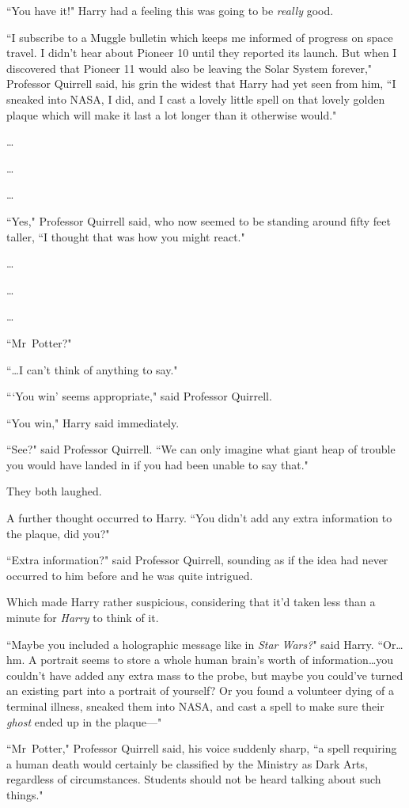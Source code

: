 ``You have it!" Harry had a feeling this was going to be \emph{really} good.

``I subscribe to a Muggle bulletin which keeps me informed of progress on space travel. I didn't hear about Pioneer 10 until they reported its launch. But when I discovered that Pioneer 11 would also be leaving the Solar System forever," Professor Quirrell said, his grin the widest that Harry had yet seen from him, ``I sneaked into NASA, I did, and I cast a lovely little spell on that lovely golden plaque which will make it last a lot longer than it otherwise would."

…

…

…

``Yes," Professor Quirrell said, who now seemed to be standing around fifty feet taller, ``I thought that was how you might react."

…

…

…

``Mr~Potter?"

``…I can't think of anything to say."

``{}`You win' seems appropriate," said Professor Quirrell.

``You win," Harry said immediately.

``See?" said Professor Quirrell. ``We can only imagine what giant heap of trouble you would have landed in if you had been unable to say that."

They both laughed.

A further thought occurred to Harry. ``You didn't add any extra information to the plaque, did you?"

``Extra information?" said Professor Quirrell, sounding as if the idea had never occurred to him before and he was quite intrigued.

Which made Harry rather suspicious, considering that it'd taken less than a minute for \emph{Harry} to think of it.

``Maybe you included a holographic message like in \emph{Star Wars?}" said Harry. ``Or…hm. A portrait seems to store a whole human brain's worth of information…you couldn't have added any extra mass to the probe, but maybe you could've turned an existing part into a portrait of yourself? Or you found a volunteer dying of a terminal illness, sneaked them into NASA, and cast a spell to make sure their \emph{ghost} ended up in the plaque—"

``Mr~Potter," Professor Quirrell said, his voice suddenly sharp, ``a spell requiring a human death would certainly be classified by the Ministry as Dark Arts, regardless of circumstances. Students should not be heard talking about such things."

